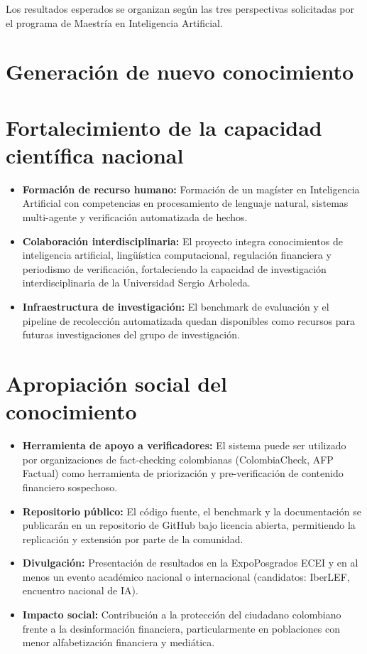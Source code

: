 Los resultados esperados se organizan según las tres perspectivas solicitadas por el programa de Maestría en Inteligencia Artificial.

\section{Generación de nuevo conocimiento}



\section{Fortalecimiento de la capacidad científica nacional}

\begin{itemize}
    \item \textbf{Formación de recurso humano:} Formación de un magíster en Inteligencia Artificial con competencias en procesamiento de lenguaje natural, sistemas multi-agente y verificación automatizada de hechos.
    \item \textbf{Colaboración interdisciplinaria:} El proyecto integra conocimientos de inteligencia artificial, lingüística computacional, regulación financiera y periodismo de verificación, fortaleciendo la capacidad de investigación interdisciplinaria de la Universidad Sergio Arboleda.
    \item \textbf{Infraestructura de investigación:} El benchmark de evaluación y el pipeline de recolección automatizada quedan disponibles como recursos para futuras investigaciones del grupo de investigación.
\end{itemize}

\section{Apropiación social del conocimiento}

\begin{itemize}
    \item \textbf{Herramienta de apoyo a verificadores:} El sistema puede ser utilizado por organizaciones de fact-checking colombianas (ColombiaCheck, AFP Factual) como herramienta de priorización y pre-verificación de contenido financiero sospechoso.
    \item \textbf{Repositorio público:} El código fuente, el benchmark y la documentación se publicarán en un repositorio de GitHub bajo licencia abierta, permitiendo la replicación y extensión por parte de la comunidad.
    \item \textbf{Divulgación:} Presentación de resultados en la ExpoPosgrados ECEI y en al menos un evento académico nacional o internacional (candidatos: IberLEF, encuentro nacional de IA).
    \item \textbf{Impacto social:} Contribución a la protección del ciudadano colombiano frente a la desinformación financiera, particularmente en poblaciones con menor alfabetización financiera y mediática.
\end{itemize}
